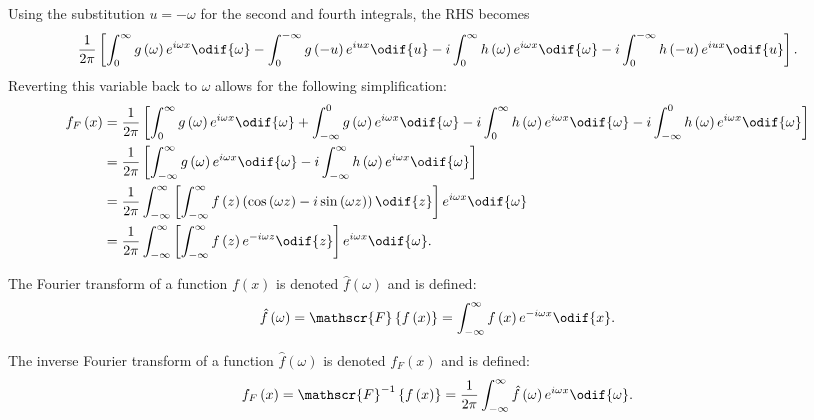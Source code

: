 \documentclass{article}
\begin{document}
Using the substitution \(u = -\omega\) for the second and fourth
integrals, the RHS becomes
\begin{equation*}
    \frac{1}{2 \pi} \left[ \int_0^\infty g\left( \omega \right) e^{i \omega x} \odif{\omega} - \int_0^{-\infty} g\left( -u \right) e^{i u x} \odif{u} - i \int_0^\infty h\left( \omega \right) e^{i \omega x} \odif{\omega} - i \int_0^{-\infty} h\left( -u \right) e^{i u x} \odif{u} \right].
\end{equation*}
Reverting this variable back to \(\omega\) allows for the following
simplification:
\begin{align*}
    f_F\left( x \right) & = \frac{1}{2 \pi} \left[ \int_0^\infty g\left( \omega \right) e^{i \omega x} \odif{\omega} + \int_{-\infty}^0 g\left( \omega \right) e^{i \omega x} \odif{\omega} - i \int_0^\infty h\left( \omega \right) e^{i \omega x} \odif{\omega} - i \int_{-\infty}^0 h\left( \omega \right) e^{i \omega x} \odif{\omega} \right] \\
                        & = \frac{1}{2 \pi} \left[ \int_{-\infty}^\infty g\left( \omega \right) e^{i \omega x} \odif{\omega} - i \int_{-\infty}^\infty h\left( \omega \right) e^{i \omega x} \odif{\omega} \right]                                                                                                                                 \\
                        & = \frac{1}{2 \pi} \int_{-\infty}^\infty \left[ \int_{-\infty}^\infty f\left( z \right) \left( \cos{\left( \omega z \right)} - i \sin{\left( \omega z \right)} \right) \odif{z} \right] e^{i \omega x} \odif{\omega}                                                                                                      \\
                        & = \frac{1}{2 \pi} \int_{-\infty}^\infty \left[ \int_{-\infty}^\infty f\left( z \right) e^{-i \omega z} \odif{z} \right] e^{i \omega x} \odif{\omega}.
\end{align*}
\begin{definition}
    The Fourier transform of a function \(f\left( x \right)\) is denoted
    \(\hat{f}\left( \omega \right)\) and is defined:
    \begin{equation*}
        \hat{f}\left( \omega \right) = \mathscr{F}\left\{ f\left( x \right) \right\} = \int_{-\infty}^\infty f\left( x \right) e^{-i \omega x} \odif{x}.
    \end{equation*}
\end{definition}
\begin{definition}
    The inverse Fourier transform of a function
    \(\hat{f}\left( \omega \right)\) is denoted
    \(f_F\left( x \right)\) and is defined:
    \begin{equation*}
        f_F\left( x \right) = \mathscr{F}^{-1}\left\{ f\left( x \right) \right\} = \frac{1}{2 \pi} \int_{-\infty}^\infty \hat{f}\left( \omega \right) e^{i \omega x} \odif{\omega}.
    \end{equation*}
\end{definition}
\end{document}
